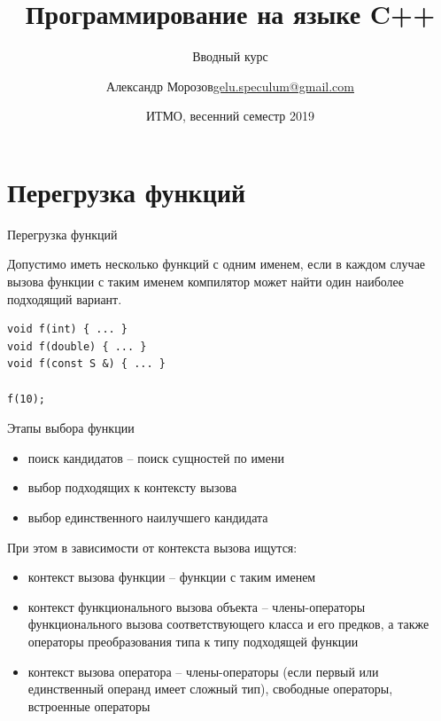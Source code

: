 \documentclass[unknownkeysallowed,xcolor=table]{beamer}
\title[C++]
{Программирование на языке C++}
\subtitle{Вводный курс}
\author[А.~Б.~Морозов]
{
  \texorpdfstring{Александр Морозов\newline\href{mailto:gelu.speculum@gmail.com}{gelu.speculum@gmail.com}}
  {Александр Морозов}
}
\date[ITMO 2019]
{ИТМО, весенний семестр 2019}
\begin{document}
\frame{\titlepage}



\section{Перегрузка функций}

\begin{frame}[fragile]{Перегрузка функций}

Допустимо иметь несколько функций с одним именем, если в каждом случае вызова функции с таким именем компилятор может найти один наиболее подходящий вариант.

\vspace{1em}

\begin{lstlisting}
void f(int) { ... }
void f(double) { ... }
void f(const S &) { ... }

f(10);
\end{lstlisting}

\end{frame}

\begin{frame}{Этапы выбора функции}

\begin{itemize}
  \item поиск кандидатов -- поиск сущностей по имени
  \item выбор подходящих к контексту вызова
  \item выбор единственного наилучшего кандидата
\end{itemize}

\vspace{1em}

При этом в зависимости от контекста вызова ищутся:
\begin{itemize}
  \item контекст вызова функции -- функции с таким именем
  \item контекст функционального вызова объекта -- члены-операторы функционального вызова соответствующего класса и его предков, а также операторы преобразования типа к типу подходящей функции
  \item контекст вызова оператора -- члены-операторы (если первый или единственный операнд имеет сложный тип), свободные операторы, встроенные операторы
\end{itemize}

\end{frame}
\end{document}
